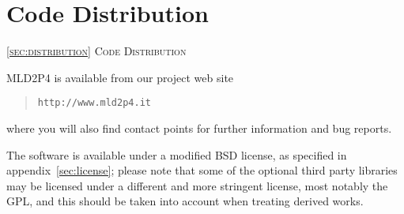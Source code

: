 \section{Code Distribution\label{sec:distribution}}
         {\textsc{\ref{sec:distribution} Code Distribution}}

\noindent
MLD2P4 is available from our project web site 
\begin{quotation}
\tt http://www.mld2p4.it
\end{quotation}
where you will also find contact points for further information and
bug reports. 

The software is available under a modified BSD license, as specified
in appendix~\ref{sec:license}; please note that some of the optional
third party libraries may be licensed under a different and more
stringent license, most notably the GPL, and this should be taken into
account when treating derived works. 
